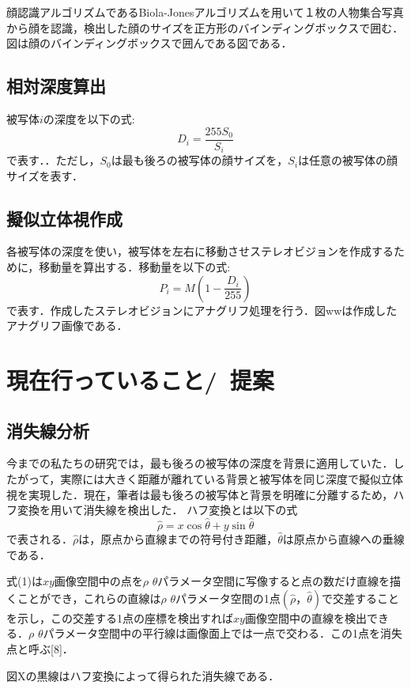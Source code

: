 \documentclass[technicalreport]{ieicej}
\begin{document}
顔認識アルゴリズムであるBiola-Jonesアルゴリズムを用いて１枚の人物集合写真から顔を認識，検出した顔のサイズを正方形のバインディングボックスで囲む．図は顔のバインディングボックスで囲んである図である．

\subsection{相対深度算出}
被写体$i$の深度を以下の式:\[D_i=\frac{255S_0}{S_i}\]で表す．．ただし，$S_0$は最も後ろの被写体の顔サイズを，$S_i$は任意の被写体の顔サイズを表す．


\subsection{擬似立体視作成}
各被写体の深度を使い，被写体を左右に移動させステレオビジョンを作成するために，移動量を算出する．移動量を以下の式:\[P_i=M(1-\frac{D_i}{255})\]で表す．作成したステレオビジョンにアナグリフ処理を行う．図wwは作成したアナグリフ画像である．
\section{現在行っていること/\ 提案}
\subsection{消失線分析}
今までの私たちの研究では，最も後ろの被写体の深度を背景に適用していた．したがって，実際には大きく距離が離れている背景と被写体を同じ深度で擬似立体視を実現した．現在，筆者は最も後ろの被写体と背景を明確に分離するため，ハフ変換を用いて消失線を検出した．
ハフ変換とは以下の式\begin{equation}\hat \rho=x \cos \hat \theta +y \sin \hat \theta \end{equation}で表される．$\hat \rho$は，原点から直線までの符号付き距離，$\hat \theta$は原点から直線への垂線である．

式(1)は$xy$画像空間中の点を$\rho$ $\theta$パラメータ空間に写像すると点の数だけ直線を描くことができ，これらの直線は$\rho$ $\theta$パラメータ空間の1点$(\hat \rho，\hat \theta)$で交差することを示し，この交差する1点の座標を検出すれば$xy$画像空間中の直線を検出できる．$\rho$ $\theta$パラメータ空間中の平行線は画像面上では一点で交わる．この1点を消失点と呼ぶ[8]．

図Xの黒線はハフ変換によって得られた消失線である．%
\end{document}

